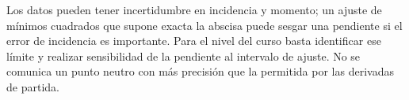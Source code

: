 Los datos pueden tener incertidumbre en incidencia y momento; un ajuste de mínimos cuadrados que supone exacta la abscisa puede sesgar una pendiente si el error de incidencia es importante. Para el nivel del curso basta identificar ese límite y realizar sensibilidad de la pendiente al intervalo de ajuste. No se comunica un punto neutro con más precisión que la permitida por las derivadas de partida.

